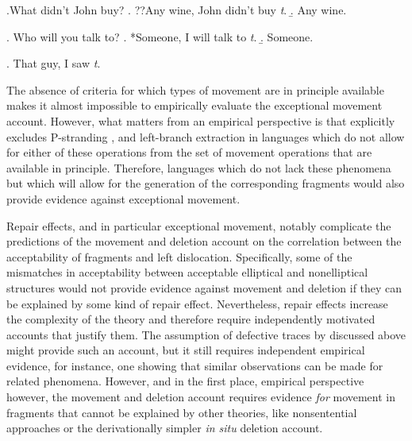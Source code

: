 \newpage
\ex.What didn't John buy? \hfill \citep[adapted from][3]{weir2015}
\a. ??Any wine, John didn't buy \textit{t}.
\b. Any wine.

\ex. Who will you talk to? \hfill \citep[adapted from][3]{weir2015}
\a. *Someone, I will talk to \textit{t}.
\b. Someone.

\ex. That guy, I saw \textit{t}.  \hfill \citep[10]{weir2015} \label{ex:weir-fronting}

The absence of criteria for which types of movement are in principle available makes it almost impossible to empirically evaluate the exceptional movement account. However, what matters from an empirical perspective is that \citet[11]{weir2015} explicitly excludes P-stranding \citep{pullum.huddleston2002}, and left-branch extraction \citep{ross1967, boskovic2005} in languages which do not allow for either of these operations from the set of movement operations that are available in principle. Therefore, languages which do not lack these phenomena but which will allow for the generation of the corresponding fragments would also provide evidence against exceptional movement.

Repair effects, and in particular exceptional movement, notably complicate the predictions of the movement and deletion account on the correlation between the acceptability of fragments and left dislocation. Specifically, some of the mismatches in acceptability between acceptable elliptical and nonelliptical structures would not provide evidence against movement and deletion if they can be explained by some kind of repair effect. Nevertheless, repair effects increase the complexity of the theory and therefore require independently motivated accounts that justify them. The assumption of defective traces by \citet{merchant2004} discussed above might provide such an account, but it still requires independent empirical evidence, for instance, one showing that similar observations can be made for related phenomena. However, and in the first place, empirical perspective however, the movement and deletion account requires evidence \textit{for} movement in fragments that cannot be explained by other theories, like nonsentential approaches or the derivationally simpler \textit{in situ} deletion account.

